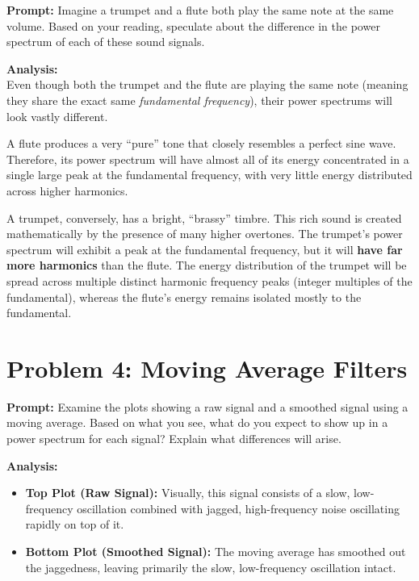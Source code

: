 \documentclass[11pt]{article}
\begin{document}
\textbf{Prompt:} Imagine a trumpet and a flute both play the same note at the same volume. Based on your reading, speculate about the difference in the power spectrum of each of these sound signals.

\textbf{Analysis:} \\
Even though both the trumpet and the flute are playing the same note (meaning they share the exact same \textit{fundamental frequency}), their power spectrums will look vastly different.

A flute produces a very ``pure'' tone that closely resembles a perfect sine wave. Therefore, its power spectrum will have almost all of its energy concentrated in a single large peak at the fundamental frequency, with very little energy distributed across higher harmonics.

A trumpet, conversely, has a bright, ``brassy'' timbre. This rich sound is created mathematically by the presence of many higher overtones. The trumpet's power spectrum will exhibit a peak at the fundamental frequency, but it will \textbf{have far more harmonics} than the flute. The energy distribution of the trumpet will be spread across multiple distinct harmonic frequency peaks (integer multiples of the fundamental), whereas the flute's energy remains isolated mostly to the fundamental.

\section*{Problem 4: Moving Average Filters}

\textbf{Prompt:} Examine the plots showing a raw signal and a smoothed signal using a moving average. Based on what you see, what do you expect to show up in a power spectrum for each signal? Explain what differences will arise.

\textbf{Analysis:}
\begin{itemize}
\item \textbf{Top Plot (Raw Signal):} Visually, this signal consists of a slow, low-frequency oscillation combined with jagged, high-frequency noise oscillating rapidly on top of it.
\item \textbf{Bottom Plot (Smoothed Signal):} The moving average has smoothed out the jaggedness, leaving primarily the slow, low-frequency oscillation intact.
\end{itemize}
\end{document}

